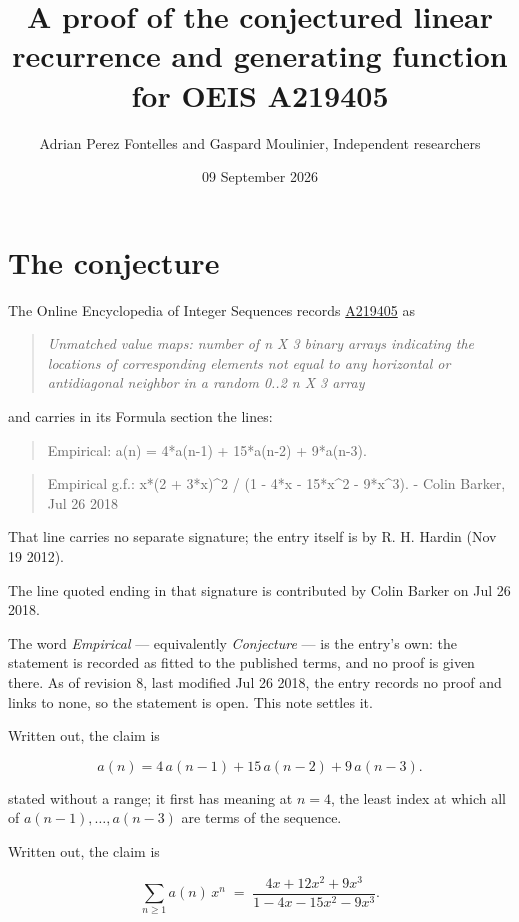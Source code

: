\documentclass[11pt]{article}
\title{A proof of the conjectured linear recurrence and generating function for OEIS A219405}
\author{Adrian Perez Fontelles and Gaspard Moulinier, Independent researchers}
\date{09 September 2026}
\theoremstyle{definition}
\begin{document}
\maketitle
\section{The conjecture}

The Online Encyclopedia of Integer Sequences records \href{https://oeis.org/A219405}{A219405} as

\begin{quote}\itshape Unmatched value maps: number of n X 3 binary arrays indicating the locations of corresponding elements not equal to any horizontal or antidiagonal neighbor in a random 0..2 n X 3 array\end{quote}

and carries in its Formula section the lines:

\begin{quote}\ttfamily Empirical: a(n) = 4*a(n-1) + 15*a(n-2) + 9*a(n-3).\end{quote}

\begin{quote}\ttfamily Empirical g.f.: x*(2 + 3*x)\textasciicircum{}2 / (1 - 4*x - 15*x\textasciicircum{}2 - 9*x\textasciicircum{}3). - Colin Barker, Jul 26 2018\end{quote}

That line carries no separate signature; the entry itself is by R. H. Hardin (Nov 19 2012).

The line quoted ending in that signature is contributed by Colin Barker on Jul 26 2018.

The word {\itshape Empirical} --- equivalently {\itshape Conjecture} --- is the entry's own: the statement is recorded as fitted to the published terms, and no proof is given there. As of revision 8, last modified Jul 26 2018, the entry records no proof and links to none, so the statement is open. This note settles it.

Written out, the claim is

\[a(n) = 4\,a(n-1) + 15\,a(n-2) + 9\,a(n-3).\]

stated without a range; it first has meaning at $n = 4$, the least index at which all of $a(n-1),\dots,a(n-3)$ are terms of the sequence.

Written out, the claim is

\[\sum_{n \ge 1} a(n)\,x^n \;=\; \frac{4x + 12x^{2} + 9x^{3}}{1 - 4x - 15x^{2} - 9x^{3}}.\]
\end{document}
